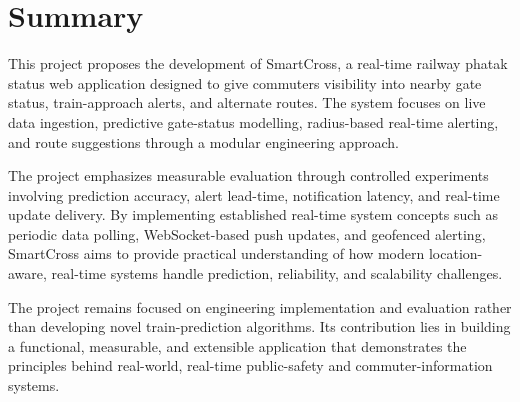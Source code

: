 \documentclass[11pt,a4paper]{article}
\begin{document}
\section{Summary}

This project proposes the development of SmartCross, a real-time railway phatak status web application designed to give commuters visibility into nearby gate status, train-approach alerts, and alternate routes. The system focuses on live data ingestion, predictive gate-status modelling, radius-based real-time alerting, and route suggestions through a modular engineering approach.

The project emphasizes measurable evaluation through controlled experiments involving prediction accuracy, alert lead-time, notification latency, and real-time update delivery. By implementing established real-time system concepts such as periodic data polling, WebSocket-based push updates, and geofenced alerting, SmartCross aims to provide practical understanding of how modern location-aware, real-time systems handle prediction, reliability, and scalability challenges.

The project remains focused on engineering implementation and evaluation rather than developing novel train-prediction algorithms. Its contribution lies in building a functional, measurable, and extensible application that demonstrates the principles behind real-world, real-time public-safety and commuter-information systems.
\end{document}
